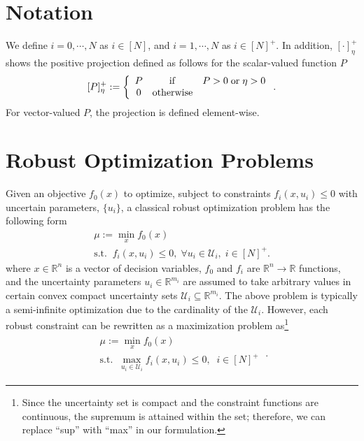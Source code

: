 \documentclass[journal,twoside,web]{ieeecolor}
\newcommand{\rev}[1]{#1}
\newcommand{\real}{\mathbb{R}}
\begin{document}
\section{Notation}\label{notations}

We define $i=0,\cdots,N$ as $i\in[N]$, and $i=1,\cdots,N$ as $i\in[N]^+$. In addition, $\left[\cdot\right]_\eta^+$ shows the positive projection defined as follows for the scalar-valued function $P$
\begin{align} \label{proj}
[P]_\eta^+:=\left\{\begin{array}{ccl}P&{\rm if}& P>0 \;{\rm or} \;\eta>0\\
0&{\rm otherwise}
\end{array}\right..
\end{align}
For vector-valued $P$, the projection is defined element-wise.

\section{Robust Optimization Problems}\label{sec_RO}
Given an objective $f_0(x)$ to optimize, subject to constraints $f_i(x,u_i) \leq 0$ with uncertain parameters, $\{u_i\}$, a classical robust optimization problem has the following form
$$
\begin{array}{l}
\mu:=\min_{x} f_0(x)\\
\text{s.t.}\;\;f_i(x,u_i)\leq 0,\; \forall u_i\in \mathcal{U}_i,\;i\in[N]^+.
\end{array}
$$
where $x\in \real^n$ is a vector of decision variables, $f_0$ and $f_i$ are $\real^n \to \real$ functions, and the uncertainty parameters $u_i \in \real^{m_i}$ are assumed to take arbitrary values in certain convex compact uncertainty sets $\mathcal{U}_i \subseteq \real^{m_i}$.
The above problem is typically a semi-infinite optimization due to the cardinality of the $\mathcal{U}_i$. However, each robust constraint can be rewritten as a maximization problem as\footnote{\rev{Since the uncertainty set is compact and the constraint functions are continuous, the supremum is attained within the set; therefore, we can replace ``sup'' with ``max'' in our formulation.}}
\begin{align}
\begin{array}{l}
\mu:=\min_{x} f_0(x)\\
\text{s.t.}\;\;\max_{u_i\in \mathcal{U}_i} f_i(x,u_i)\leq 0,\;\;i\in[N]^+
\end{array}\;.\label{standardRO}
\end{align}
\end{document}
